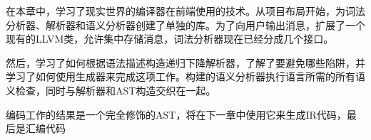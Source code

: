 在本章中，学习了现实世界的编译器在前端使用的技术。从项目布局开始，为词法分析器、解析器和语义分析器创建了单独的库。为了向用户输出消息，扩展了一个现有的LLVM类，允许集中存储消息，词法分析器现在已经分成几个接口。

然后，学习了如何根据语法描述构造递归下降解析器，了解了要避免哪些陷阱，并学习了如何使用生成器来完成这项工作。构建的语义分析器执行语言所需的所有语义检查，同时与解析器和AST构造交织在一起。

编码工作的结果是一个完全修饰的AST，将在下一章中使用它来生成IR代码，最后是汇编代码